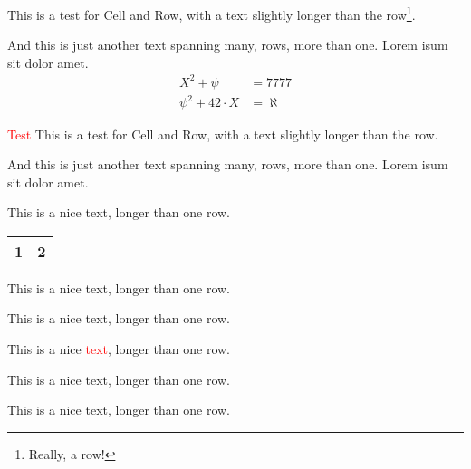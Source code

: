 \documentclass{scrartcl}
\begin{document}
%
\begin{Row}%
\begin{Cell}{2}
This is a test for Cell and Row, with a text slightly longer than the row\footnote{Really, a row!}.
\end{Cell}
\begin{Cell}{1}
And this is just another text spanning many, rows, more than one. Lorem isum sit dolor amet.
\begin{eqnarray}
X^2 + \psi &= 7777\\
\psi^2 + 42 \cdot X &= \aleph
\end{eqnarray}
\end{Cell}
\end{Row}

\bigskip

\begin{Row}%
\begin{Cell}{2}
\textcolor{red}{Test}
This is a test for Cell and Row, with a text slightly longer than the row.
\end{Cell}%
\begin{Cell}{1}
And this is just another text spanning many, rows, more than one. Lorem isum sit dolor amet.
\end{Cell}%
\end{Row}

\bigskip

\begin{row}[cellsep=0.5cm]{3}{3}%
\begin{cell}{1}
This is a nice text, longer than one row.

\begin{tabular}{cc}\hline
1 & 2\\\hline
\end{tabular}
\end{cell}
\begin{cell}{1}
This is a nice text, longer than one row.
\end{cell}
\begin{cell}{1}
This is a nice text, longer than one row.
\end{cell}
\end{row}

\begin{row}[cellsep=0.5cm]{3}{3}%
\begin{cell}{1}
This is a nice \textcolor{red}{text}, longer than one row.
\end{cell}
\begin{cell}{1}
This is a nice text, longer than one row.
\end{cell}
\begin{cell}{1}
This is a nice text, longer than one row.
\end{cell}
\end{row}

\bigskip

\end{document}
